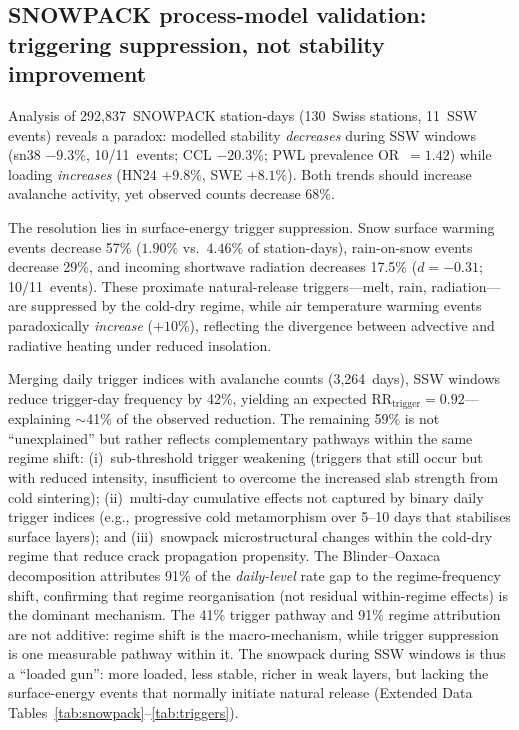 \documentclass[11pt,letterpaper]{article}
\begin{document}
\subsection*{SNOWPACK process-model validation: triggering suppression, not stability improvement}

Analysis of 292,837~SNOWPACK station-days (130~Swiss stations, 11~SSW events) reveals a paradox: modelled stability \emph{decreases} during SSW windows (sn38 $-9.3\%$, 10/11~events; CCL $-20.3\%$; PWL prevalence OR~$= 1.42$) while loading \emph{increases} (HN24 $+9.8\%$, SWE $+8.1\%$). Both trends should increase avalanche activity, yet observed counts decrease 68\%.

The resolution lies in surface-energy trigger suppression. Snow surface warming events decrease 57\% ($1.90\%$ vs.\ $4.46\%$ of station-days), rain-on-snow events decrease 29\%, and incoming shortwave radiation decreases 17.5\% ($d = -0.31$; 10/11~events). These proximate natural-release triggers---melt, rain, radiation---are suppressed by the cold-dry regime, while air temperature warming events paradoxically \emph{increase} ($+10\%$), reflecting the divergence between advective and radiative heating under reduced insolation.

Merging daily trigger indices with avalanche counts (3,264~days), SSW windows reduce trigger-day frequency by 42\%, yielding an expected $\mathrm{RR}_{\mathrm{trigger}} = 0.92$---explaining $\sim$41\% of the observed reduction. The remaining 59\% is not ``unexplained'' but rather reflects complementary pathways within the same regime shift: (i)~sub-threshold trigger weakening (triggers that still occur but with reduced intensity, insufficient to overcome the increased slab strength from cold sintering); (ii)~multi-day cumulative effects not captured by binary daily trigger indices (e.g., progressive cold metamorphism over 5--10 days that stabilises surface layers); and (iii)~snowpack microstructural changes within the cold-dry regime that reduce crack propagation propensity. The Blinder--Oaxaca decomposition attributes 91\% of the \emph{daily-level} rate gap to the regime-frequency shift, confirming that regime reorganisation (not residual within-regime effects) is the dominant mechanism. The 41\% trigger pathway and 91\% regime attribution are not additive: regime shift is the macro-mechanism, while trigger suppression is one measurable pathway within it. The snowpack during SSW windows is thus a ``loaded gun'': more loaded, less stable, richer in weak layers, but lacking the surface-energy events that normally initiate natural release (Extended Data Tables~\ref{tab:snowpack}--\ref{tab:triggers}).
\end{document}

